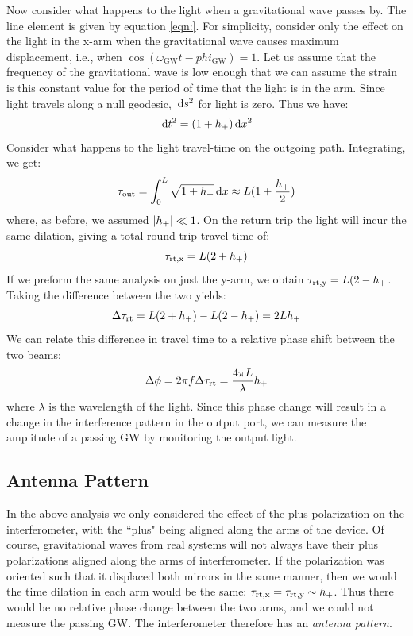 Now consider what happens to the light when a gravitational wave passes by. The line element is given by equation \ref{eqn:}. For simplicity, consider only the effect on the light in the x-arm when the gravitational wave causes maximum displacement, i.e., when $\cos(\omega_{\mathrm{GW}}t - phi_{\mathrm{GW}}) = 1$. Let us assume that the frequency of the gravitational wave is low enough that we can assume the strain is this constant value for the period of time that the light is in the arm. Since light travels along a null geodesic, $\,\mathrm{d} s^2$ for light is zero. Thus we have:
\begin{equation}
\,\mathrm{d} t^2 = (1 + h_{+})\,\mathrm{d} x^2
\end{equation}
Consider what happens to the light travel-time on the outgoing path. Integrating, we get:
\begin{equation}
\tau_{\mathrm{out}} = \int_{0}^{L} \sqrt{1 + h_{+}} \,\mathrm{d} x \approx L(1 + \frac{h_{+}}{2})
\end{equation}
where, as before, we assumed $|h_{+}| \ll 1$. On the return trip the light will incur the same dilation, giving a total round-trip travel time of:
\begin{equation}
\tau_{\mathrm{rt,x}} = L(2 + h_{+})
\end{equation}
If we preform the same analysis on just the y-arm, we obtain $\tau_{\mathrm{rt,y}} = L(2-h_{+}$. Taking the difference between the two yields:
\begin{equation}
\Delta \tau_{\mathrm{rt}} = L(2+h_{+}) - L(2-h_{+}) = 2L h_{+}
\end{equation}
We can relate this difference in travel time to a relative phase shift between the two beams:
\begin{equation}
\Delta \phi = 2\pi f \Delta \tau_{\mathrm{rt}} = \frac{4 \pi L}{\lambda} h_{+}
\end{equation}
where $\lambda$ is the wavelength of the light. Since this phase change will result in a change in the interference pattern in the output port, we can measure the amplitude of a passing \ac{GW} by monitoring the output light.

\subsection{Antenna Pattern}

In the above analysis we only considered the effect of the plus polarization on the interferometer, with the ``plus" being aligned along the arms of the device. Of course, gravitational waves from real systems will not always have their plus polarizations aligned along the arms of interferometer. If the polarization was oriented such that it displaced both mirrors in the same manner, then we would the time dilation in each arm would be the same: $\tau_{\mathrm{rt,x}} = \tau_{\mathrm{rt,y}} \sim h_{+}$. Thus there would be no relative phase change between the two arms, and we could not measure the passing \ac{GW}. The interferometer therefore has an \emph{antenna pattern}.

